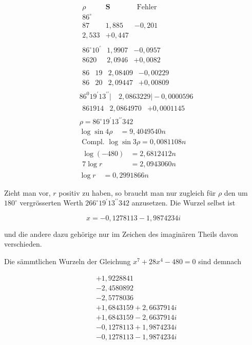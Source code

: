 \documentclass[twoside,12pt, showframe]{memoir}
\begin{document}
\[
\begin{aligned}
& \begin{array}{c|c|c}
\rho & \boldsymbol{S} & \text { Fehler } \\
86^{\circ} \\
87 & 1,885 & -0,201 \\
2,533 & +0,447
\end{array} \\
& \begin{array}{l|l|l}
86^{\circ} 10^{\prime} & 1,9907 & -0,0957 \\
8620 & 2,0946 & +0,0082
\end{array} \\
& \begin{array}{ll|l|l}
86 & 19 & 2,08409 & -0,00229 \\
86 & 20 & 2,09447 & +0,00809
\end{array} \\
& 86^{0} 19^{\prime} 13^{\prime \prime}|\quad 2,0863229|-0,0000596 \\
& \begin{array}{l|l|l}
861914 & 2,0864970 & +0,0001145
\end{array} \\
& \rho=86^{\circ} 19^{\prime} 13^{\prime \prime} 342 \\
& \log \sin 4 \rho \quad=9,4049540 n \\
& \text { Compl. } \log \sin 3 \rho=0,0081108 n \\
& \begin{array}{ll}
\log (-480) & =2,6812412 n \\
\hline 7 \log r & =2,0943060 n
\end{array} \\
& \log r \quad=0,2991866 n
\end{aligned}
\]

Zieht man vor, \(r\) positiv zu haben, so braucht man nur zugleich für \(\rho\) den um \(180^{\circ}\) vergrösserten Werth \(266^{\circ} 19^{\prime} 13^{\prime \prime} 342\) anzusetzen. Die Wurzel selbst ist

\[
x=-0,1278113-1,9874234 i
\]

und die andere dazu gehörige nur im Zeichen des imaginären Theils davon verschieden.

Die sämmtlichen Wurzeln der Gleichung \(x^{7}+28 x^{4}-480=0\) sind demnach

\[
\begin{aligned}
& +1,9228841 \\
& -2,4580892 \\
& -2,5778036 \\
& +1,6843159+2,6637914 i \\
& +1,6843159-2,6637914 i \\
& -0,1278113+1,9874234 i \\
& -0,1278113-1,9874234 i
\end{aligned}
\]
\end{document}
